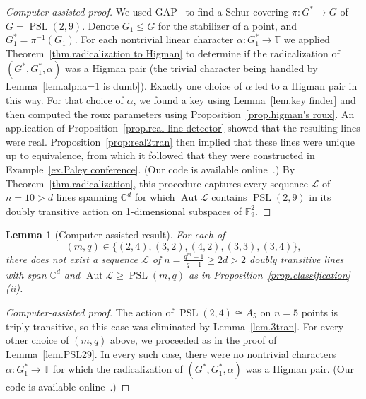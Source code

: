\documentclass[11pt]{article}
\newtheorem{lemma}[theo]{Lemma}
\theoremstyle{definition}
\numberwithin{equation}{section}
\begin{document}
\begin{proof}[Computer-assisted proof]
We used GAP~\cite{GAP} to find a Schur covering $\pi \colon G^* \to G$ of $G=\operatorname{PSL}(2,9)$.
Denote $G_1 \leq G$ for the stabilizer of a point, and $G_1^* = \pi^{-1}(G_1)$.
For each nontrivial linear character $\alpha \colon G_1^* \to \mathbb{T}$ we applied Theorem~\ref{thm.radicalization to Higman} to determine if the radicalization of $(G^*,G_1^*,\alpha)$ was a Higman pair (the trivial character being handled by Lemma~\ref{lem.alpha=1 is dumb}).
Exactly one choice of $\alpha$ led to a Higman pair in this way.
For that choice of $\alpha$, we found a key using Lemma~\ref{lem.key finder} and then computed the roux parameters using Proposition~\ref{prop.higman's roux}.
An application of Proposition~\ref{prop.real line detector} showed that the resulting lines were real.
Proposition~\ref{prop:real2tran} then implied that these lines were unique up to equivalence, from which it followed that they were constructed in Example~\ref{ex.Paley conference}.
(Our code is available online~\cite{github}.)
By Theorem~\ref{thm.radicalization}, this procedure captures every sequence $\mathscr{L}$ of $n=10 > d$ lines spanning $\mathbb{C}^d$ for which $\operatorname{Aut} \mathscr{L}$ contains $\operatorname{PSL}(2,9)$ in its doubly transitive action on 1-dimensional subspaces of $\mathbb{F}_9^2$.
\end{proof}

\begin{lemma}[Computer-assisted result]
\label{lem.PSL weirdos}
For each of
\[
(m,q)\in\{(2,4),(3,2),(4,2),(3,3),(3,4)\},
\]
there does not exist a sequence $\mathscr{L}$ of $n = \frac{q^m-1}{q-1} \geq 2d > 2$ doubly transitive lines with span $\mathbb{C}^d$ and $\operatorname{Aut} \mathscr{L} \geq\operatorname{PSL}(m,q)$ as in Proposition~\ref{prop.classification}(ii).
\end{lemma}

\begin{proof}[Computer-assisted proof]
The action of $\operatorname{PSL}(2,4)\cong A_5$ on $n=5$ points is triply transitive, so this case was eliminated by Lemma~\ref{lem.3tran}.
For every other choice of $(m,q)$ above, we proceeded as in the proof of Lemma~\ref{lem.PSL29}.
In every such case, there were no nontrivial characters $\alpha \colon G_1^* \to \mathbb{T}$ for which the radicalization of $(G^*,G_1^*,\alpha)$ was a Higman pair.
(Our code is available online~\cite{github}.)
\end{proof}
\end{document}
